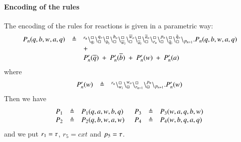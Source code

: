 \paragraph{Encoding of the rules}
The encoding of the rules for reactions is  given in a parametric way:
\[
\begin{array}{lcl}
P_n(q,b,w,a,q) & \triangleq & {}^{r_n}\backslash_{q_i}^{\scriptstyle {\square}}\backslash_{\scriptstyle {\square}}^{q_o}
                                                    \backslash_{b_i}^{\scriptstyle {\square}}\backslash_{\scriptstyle {\square}}^{b_o}
                                                     \backslash_{\overline{w}_i}^{\scriptstyle {\square}}\backslash_{\scriptstyle {\square}}^{\overline{w}_o}
					        \backslash_{\overline{a}_i}^{\scriptstyle {\square}}\backslash_{\scriptstyle {\square}}^{\overline{a}_o}
					        \backslash_{r_n}^{\scriptstyle {\square}}\backslash_{\scriptstyle {\square}}^{p_n}
					        \backslash_{\tilde{q}_i}^{\scriptstyle {\square}}\backslash_{\scriptstyle {\square}}^{\tilde{q}_o}
			\backslash_{p_{n+1}}.P_n(q,b,w,a,q)  \\
			&& +\\
			&&P_n'(\overline{q}) \ +\ P_n'(\overline{b}) \ + \ P_n'(w)\ +\ P_n'(a)\\
			\end{array}
			\]
			\noindent
			where
			\[
\begin{array}{lcl}
P_n'(w) &\triangleq &  {}^{r_n}\backslash_{w_i}^{\scriptstyle {\square}}\backslash_{\scriptstyle {\square}}^{w_o}\backslash_{r_{n+1}}^{\scriptstyle {\square}}\backslash_{\scriptstyle {\square}}^{p_n} \backslash_{p_{n+1}}.P_n'(w) 
\end{array}
\]
\noindent
Then we have 
\[
\begin{array}{lcl @{\hspace{0.5cm}}lcl  }
P_1 & \defeq & P_1(q,a,w,b,q) & P_3 & \defeq & P_3(w,a,q,b,w)  \\
P_2 & \defeq & P_2(q,b,w,a,w) &P_4 & \defeq & P_4(w,b,q,a,q) 
\end{array}
\]
\noindent
and we put $r_1 = \tau$, $r_5 = cxt$ and  $p_5 = \tau$.

